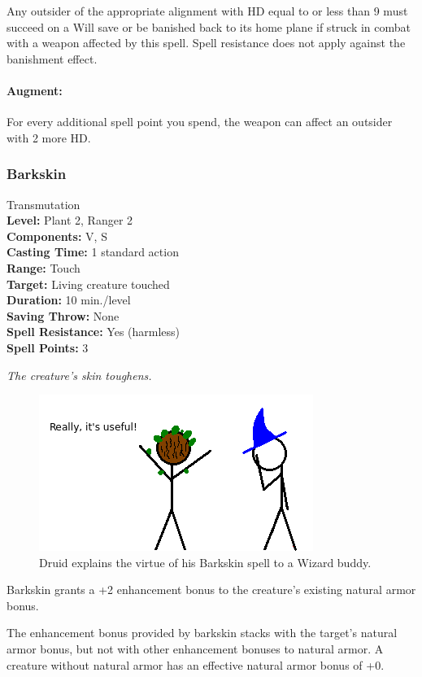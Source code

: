 Any outsider of the appropriate alignment with HD equal to or less than 9 must succeed on a Will save or be banished back to its home plane if struck in combat with a weapon affected by this spell. 
Spell resistance does not apply against the banishment effect.

\paragraph{Augment:} For every additional spell point you spend, the weapon can affect an outsider with 2 more HD.
\subsubsection{Barkskin}
\label{Spell:Barkskin}
Transmutation
\\ \textbf{Level:} Plant 2, Ranger 2
\\ \textbf{Components:} V, S
\\ \textbf{Casting Time:} 1 standard action
\\ \textbf{Range:} Touch
\\ \textbf{Target:} Living creature touched
\\ \textbf{Duration:} 10 min./level
\\ \textbf{Saving Throw:} None
\\ \textbf{Spell Resistance:} Yes (harmless)
\\ \textbf{Spell Points:} 3

\emph{The creature's skin toughens.}

\begin{figure}
  \caption{Druid explains the virtue of his Barkskin spell to a Wizard buddy.}
  \centering
    \includegraphics{Pics/Barkskin.png}
\end{figure}

Barkskin grants a +2 enhancement bonus to the creature's existing natural armor bonus.

The enhancement bonus provided by barkskin stacks with the target's natural armor bonus, but not with other enhancement bonuses to natural armor. A creature without natural armor has an effective natural armor bonus of +0.

